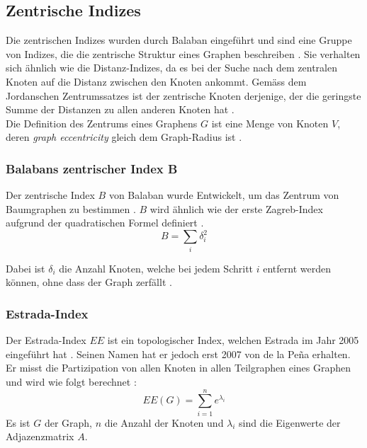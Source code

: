 \subsection{Zentrische Indizes}

Die zentrischen Indizes wurden durch Balaban eingeführt und sind eine Gruppe von Indizes, die die zentrische Struktur eines Graphen beschreiben \cite{balaban_1983_2014}.
Sie verhalten sich ähnlich wie die Distanz-Indizes, da es bei der Suche nach dem zentralen Knoten auf die Distanz zwischen den Knoten ankommt.
Gemäss dem Jordanschen Zentrumssatzes ist der zentrische Knoten derjenige, der die geringste Summe der Distanzen zu allen anderen Knoten hat \cite[p.~32]{gross_graph_2018}. \\
Die Definition des Zentrums eines Graphens $ G $ ist eine Menge von Knoten $ V $, deren \textit{graph eccentricity} gleich dem Graph-Radius ist \cite[p.~35]{harary_graph_1994}.

\subsubsection{Balabans zentrischer Index B}

Der zentrische Index $B$ von Balaban wurde Entwickelt, um das Zentrum von Baumgraphen zu bestimmen \cite[p.~355]{balaban_chemical_1979}.
$ B $ wird ähnlich wie der erste Zagreb-Index aufgrund der quadratischen Formel definiert \cite[p.~355]{balaban_chemical_1979}.
\begin{equation}
    B = \sum_{i} \delta_i^2
\end{equation}

Dabei ist $ \delta_i $ die Anzahl Knoten, welche bei jedem Schritt $ i $ entfernt werden können, ohne dass der Graph zerfällt \cite[p.~355]{balaban_chemical_1979}.

\subsubsection{Estrada-Index}

Der Estrada-Index $ EE $ ist ein topologischer Index, welchen Estrada im Jahr 2005 eingeführt hat \cite{estrada_subgraph_2005}. 
Seinen Namen hat er jedoch erst 2007 von de la Peña \cite{de_la_pena_estimating_2007} erhalten. Er misst die Partizipation von allen Knoten in allen Teilgraphen eines Graphen \cite[p.~6]{estrada_subgraph_2005} und wird wie folgt berechnet \cite[p.~6]{estrada_subgraph_2005}:
\begin{equation}
    EE(G) = \sum_{i=1}^n e^{\lambda_i}
\end{equation}
Es ist $ G $ der Graph, $ n $ die Anzahl der Knoten und $ \lambda_i $ sind die Eigenwerte der Adjazenzmatrix $ A $.

